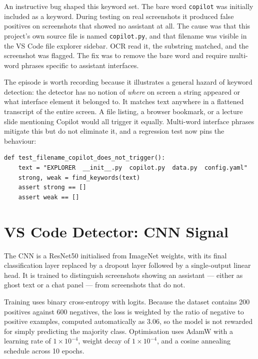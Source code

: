 \documentclass[12pt,oneside]{report}
\newcommand{\code}[1]{\texttt{\small #1}}
\begin{document}
An instructive bug shaped this keyword set. The bare word \code{copilot} was
initially included as a keyword. During testing on real screenshots it produced
false positives on screenshots that showed no assistant at all. The cause was
that this project's own source file is named \code{copilot.py}, and that
filename was visible in the VS Code file explorer sidebar. OCR read it, the
substring matched, and the screenshot was flagged. The fix was to remove the
bare word and require multi-word phrases specific to assistant interfaces.

The episode is worth recording because it illustrates a general hazard of
keyword detection: the detector has no notion of \emph{where} on screen a
string appeared or what interface element it belonged to. It matches text
anywhere in a flattened transcript of the entire screen. A file listing, a
browser bookmark, or a lecture slide mentioning Copilot would all trigger it
equally. Multi-word interface phrases mitigate this but do not eliminate it,
and a regression test now pins the behaviour:

\begin{lstlisting}[caption={Regression test for the filename false positive.}]
def test_filename_copilot_does_not_trigger():
    text = "EXPLORER  __init__.py  copilot.py  data.py  config.yaml"
    strong, weak = find_keywords(text)
    assert strong == []
    assert weak == []
\end{lstlisting}

\section{VS Code Detector: CNN Signal}
\label{sec:cnndetector}

The CNN is a ResNet50 initialised from ImageNet weights, with its final
classification layer replaced by a dropout layer followed by a single-output
linear head. It is trained to distinguish screenshots showing an assistant
--- either as ghost text or a chat panel --- from screenshots that do not.

Training uses binary cross-entropy with logits. Because the dataset contains
200 positives against 600 negatives, the loss is weighted by the ratio of
negative to positive examples, computed automatically as 3.06, so the model is
not rewarded for simply predicting the majority class. Optimisation uses AdamW
with a learning rate of $1\times10^{-4}$, weight decay of $1\times10^{-4}$, and
a cosine annealing schedule across 10 epochs.
\end{document}
